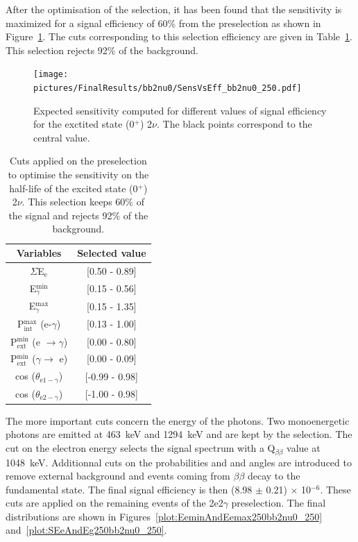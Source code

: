 \documentclass[main.tex]{subfiles}
\begin{document}


\NI After the optimisation of the selection, it has been found that the sensitivity is maximized for a signal efficiency of 60\% from the preselection as shown in Figure~\ref{plot:SensVsEffbb2nu0_250}. The cuts corresponding to this selection efficiency are given in Table~\ref{tab:Cuts2nu0Plus250keV}. This selection rejects 92\% of the background.


\begin{figure} [h!]
\begin{center}
\texttt{[image: pictures/FinalResults/bb2nu0/SensVsEff\_bb2nu0\_250.pdf]}
\end{center}
\caption{Expected sensitivity computed for different values of signal efficiency for the exctited state (0$^+$) 2$\nu$. The black points correspond to the central value.}
\label{plot:SensVsEffbb2nu0_250}
\end{figure}



\begin{table}[h!]
\centering
\begin{tabular}{c|c}
Variables & Selected value \\
\toprule
$\Sigma$E$_{\text{e}}$ & [0.50 - 0.89] \\
E$_{\gamma}^{\text{min}}$    & [0.15 - 0.56] \\
E$_{\gamma}^{\text{max}}$    & [0.15 - 1.35] \\
P$_{\text{int}}^{\text{max}}$ (e-$\gamma$) & [0.13 - 1.00] \\
P$_{\text{ext}}^{\text{min}}$ (e $\rightarrow \gamma$) & [0.00 - 0.80] \\
P$_{\text{ext}}^{\text{min}}$ ($\gamma \rightarrow$ e) & [0.00 - 0.09] \\
cos ($\theta_{\text{e1}-\gamma}$) & [-0.99 - 0.98] \\
cos ($\theta_{\text{e2}-\gamma}$) & [-1.00 - 0.98] \\
\bottomrule
\end{tabular}
\caption{Cuts applied on the preselection to optimise the sensitivity on the half-life of the excited state (0$^+$) 2$\nu$. This selection keeps 60\% of the signal and rejects 92\% of the background.}
\label{tab:Cuts2nu0Plus250keV}
\end{table}


\bigskip


\NI The more important cuts concern the energy of the photons. Two monoenergetic photons are emitted at 463~keV and 1294~keV and are kept by the selection. The cut on the electron energy selects the signal spectrum with a Q$_{\beta\beta}$ value at 1048~keV. Additionnal cuts on the probabilities and and angles are introduced to remove external background and events coming from $\beta\beta$ decay to the fundamental state. The final signal efficiency is then (8.98 $\pm$ 0.21) $\times$ 10$^{-\text{6}}$. These cuts are applied on the remaining events of the 2e2$\gamma$ preselection. The final distributions are shown in Figures~\ref{plot:EeminAndEemax250bb2nu0_250} and~\ref{plot:SEeAndEg250bb2nu0_250}. 
\end{document}
